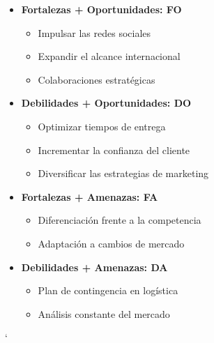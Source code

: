 \documentclass[12pt]{article}
\begin{document}
\begin{itemize}
	\item \textbf{Fortalezas + Oportunidades: FO} 

	\begin{itemize}
		\item Impulsar las redes sociales
		
		\item Expandir el alcance internacional
		
		\item Colaboraciones estratégicas

	\end{itemize}

	\item \textbf{Debilidades + Oportunidades: DO}

	\begin{itemize}
		\item Optimizar tiempos de entrega
		
		\item Incrementar la confianza del cliente
		
		\item Diversificar las estrategias de marketing

	\end{itemize}

	\item \textbf{Fortalezas + Amenazas: FA}

	\begin{itemize}
		\item Diferenciación frente a la competencia
		
		\item Adaptación a cambios de mercado

	\end{itemize}

	\item \textbf{Debilidades + Amenazas: DA}

	\begin{itemize}
		\item Plan de contingencia en logística
		
		\item Análisis constante del mercado

	\end{itemize}

\end{itemize}

`
\end{document}
